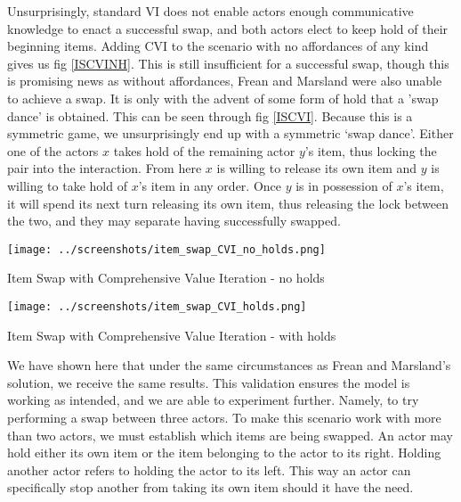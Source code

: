 Unsurprisingly, standard VI does not enable actors enough communicative knowledge to enact a successful swap, and both actors elect to keep hold of their beginning items. Adding CVI to the scenario with no affordances of any kind gives us fig \ref{ISCVINH}. This is still insufficient for a successful swap, though this is promising news as without affordances, Frean and Marsland were also unable to achieve a swap. It is only with the advent of some form of hold that a 'swap dance' is obtained. This can be seen through fig \ref{ISCVI}. Because this is a symmetric game, we unsurprisingly end up with a symmetric ‘swap dance’. Either one of the actors $x$ takes hold of the remaining actor $y$’s item, thus locking the pair into the interaction. From here $x$ is willing to release its own item and $y$ is willing to take hold of $x$’s item in any order. Once $y$ is in possession of $x$’s item, it will spend its next turn releasing its own item, thus releasing the lock between the two, and they may separate having successfully swapped.

\begin{fig}[H]
  \begin{minipage}[b]{1.0\linewidth}
    \centering
    \centerline{\texttt{[image: ../screenshots/item\_swap\_CVI\_no\_holds.png]}}
    \caption{Item Swap with Comprehensive Value Iteration - no holds}\medskip\label{ISCVINH}
  \end{minipage}
\end{fig}

\begin{fig}[H]
  \begin{minipage}[b]{1.0\linewidth}
    \centering
    \centerline{\texttt{[image: ../screenshots/item\_swap\_CVI\_holds.png]}}
    \caption{Item Swap with Comprehensive Value Iteration - with holds}\medskip\label{ISCVI}
  \end{minipage}
\end{fig}

We have shown here that under the same circumstances as Frean and Marsland's solution, we receive the same results. This validation ensures the model is working as intended, and we are able to experiment further. Namely, to try performing a swap between three actors. To make this scenario work with more than two actors, we must establish which items are being swapped. An actor may hold either its own item or the item belonging to the actor to its right. Holding another actor refers to holding the actor to its left. This way an actor can specifically stop another from taking its own item should it have the need.

